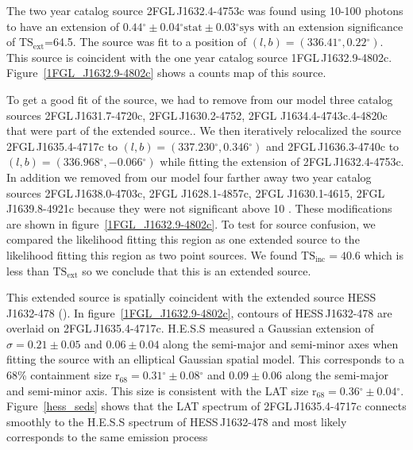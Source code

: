 \documentclass[12pt,preprint]{aastex}
\newcommand{\gev}{\text{GeV}\xspace}
\newcommand{\tev}{\text{TeV}\xspace}
\newcommand{\tsext}{{\ensuremath{\text{TS}_{\text{ext}}}}\xspace}
\newcommand{\tsinc}{\ensuremath{\text{TS}_{\text{inc}}}\xspace}
\newcommand{\rsixeight}{{\ensuremath{\text{r}_{68}}}\xspace}
\newcommand{\sys}{\text{sys}\xspace}
\newcommand{\stat}{\text{stat}\xspace}
\renewcommand{\deg}{\ensuremath{^\circ}\xspace}
\begin{document}

The two year catalog source 2FGL\,J1632.4-4753c was found 
using 10-100 \gev photons to
have an extension of $0.44\deg\pm0.04\deg\stat\pm0.03\deg\sys$ 
with an extension
significance of \tsext=64.5.  The source was fit to a position of
$(l,b)=(336.41\deg,0.22\deg)$.  This source is coincident with the one
year catalog source 1FGL\,J1632.9-4802c.  Figure~\ref{1FGL_J1632.9-4802c}
shows a counts map of this source.

To get a good fit of the source, we had to remove from our model
three catalog sources 2FGL\,J1631.7-4720c, 2FGL\,J1630.2-4752,
2FGL J1634.4-4743c.4-4820c that were part of the extended source..
We then iteratively relocalized the source 2FGL\,J1635.4-4717c
to $(l,b)=(337.230\deg,0.346\deg)$ and 2FGL\,J1636.3-4740c to
$(l,b)=(336.968\deg,-0.066\deg)$ while fitting the extension of
2FGL\,J1632.4-4753c.  In addition we removed from our model four
farther away two year catalog sources 2FGL\,J1638.0-4703c, 2FGL
J1628.1-4857c, 2FGL  J1630.1-4615, 2FGL\,J1639.8-4921c because they
were not significant above 10 \gev.  These modifications are shown
in figure~\ref{1FGL_J1632.9-4802c}.  To test for source confusion,
we compared the likelihood fitting this region as one extended source
to the likelihood fitting this region as two point sources. We found
$\tsinc=40.6$ which is less than \tsext so we conclude
that this is an extended source.

This extended source is spatially coincident with the extended
\tev source HESS\,J1632-478 (\cite{hess_plane_survey}).  In
figure~\ref{1FGL_J1632.9-4802c}, contours of  HESS\,J1632-478 are
overlaid on 2FGL\,J1635.4-4717c.  H.E.S.S measured a Gaussian extension of
$\sigma=0.21\pm0.05$ and $0.06\pm0.04$ along the semi-major and semi-minor
axes when fitting the source with an elliptical Gaussian spatial model.
This corresponds to a 68\% containment size $\rsixeight=0.31\deg\pm0.08\deg$
and $0.09\pm0.06$ along the semi-major and semi-minor axis. This
size is consistent with the LAT size $\rsixeight=0.36\deg\pm0.04\deg$.
Figure~\ref{hess_seds} shows that the LAT spectrum of 2FGL\,J1635.4-4717c
connects smoothly to the H.E.S.S spectrum of HESS\,J1632-478 and most
likely corresponds to the same emission process
\end{document}
